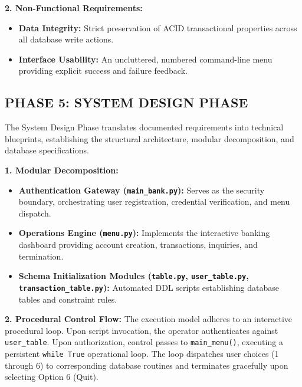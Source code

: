 \documentclass[12pt,a4paper]{article}
\begin{document}
\vspace{0.4em}
\noindent\textbf{2. Non-Functional Requirements:}
\begin{itemize}
    \item \textbf{Data Integrity:} Strict preservation of ACID transactional properties across all database write actions.
    \item \textbf{Interface Usability:} An uncluttered, numbered command-line menu providing explicit success and failure feedback.
\end{itemize}

\clearpage

\subsection*{PHASE 5: SYSTEM DESIGN PHASE}
The System Design Phase translates documented requirements into technical blueprints, establishing the structural architecture, modular decomposition, and database specifications.

\vspace{0.6em}
\noindent\textbf{1. Modular Decomposition:}
\begin{itemize}
    \item \textbf{Authentication Gateway (\texttt{main\_bank.py}):} Serves as the security boundary, orchestrating user registration, credential verification, and menu dispatch.
    \item \textbf{Operations Engine (\texttt{menu.py}):} Implements the interactive banking dashboard providing account creation, transactions, inquiries, and termination.
    \item \textbf{Schema Initialization Modules (\texttt{table.py}, \texttt{user\_table.py}, \texttt{transaction\_table.py}):} Automated DDL scripts establishing database tables and constraint rules.
\end{itemize}

\vspace{0.6em}
\noindent\textbf{2. Procedural Control Flow:}
The execution model adheres to an interactive procedural loop. Upon script invocation, the operator authenticates against \texttt{user\_table}. Upon authorization, control passes to \texttt{main\_menu()}, executing a persistent \texttt{while True} operational loop. The loop dispatches user choices (1 through 6) to corresponding database routines and terminates gracefully upon selecting Option 6 (Quit).
\end{document}
